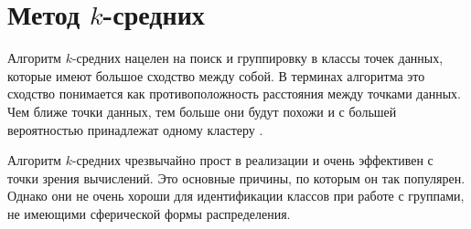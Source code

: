 \section{Метод $k$-средних}

Алгоритм $k$-средних нацелен на поиск и группировку в классы точек данных, которые имеют большое сходство между собой. В терминах алгоритма это сходство понимается как противоположность расстояния между точками данных. Чем ближе точки данных, тем больше они будут похожи и с большей вероятностью принадлежат одному кластеру \cite{bib_9}.

Алгоритм $k$-средних чрезвычайно прост в реализации и очень эффективен с точки зрения вычислений. Это основные причины, по которым он так популярен. Однако они не очень хороши для идентификации классов при работе с группами, не имеющими сферической формы распределения.








